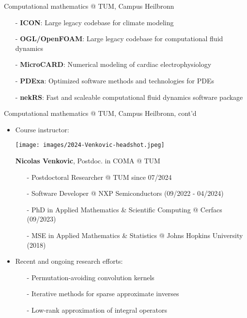 \documentclass[t,usepdftitle=false]{beamer}
\begin{document}
\begin{frame}{Computational mathematics @ TUM, Campus Heilbronn}
\begin{itemize}
\begin{itemize}
\item[-] \textbf{ICON}: Large legacy codebase for climate modeling\vspace{.05cm}
\item[-] \textbf{OGL/OpenFOAM}: Large legacy codebase for computational fluid dynamics\vspace{.05cm}
\item[-] \textbf{MicroCARD}: Numerical modeling of cardiac electrophysiology\vspace{.05cm}
\item[-] \textbf{PDExa}: Optimized software methods and technologies for PDEs\vspace{.05cm}
\item[-] \textbf{nekRS}: Fast and scaleable computational fluid dynamics software package
\end{itemize}
\end{itemize}
\end{frame}

\begin{frame}{Computational mathematics @ TUM, Campus Heilbronn, cont'd}
\begin{itemize}
\item Course instructor:
\begin{center}\texttt{[image: images/2024-Venkovic-headshot.jpeg]}\end{center}\vspace{.15cm}
\textbf{Nicolas Venkovic}, Postdoc. in COMA @ TUM%
\begin{itemize}
\item[-] Postdoctoral Researcher @ TUM since 07/2024\vspace{.07cm}
\item[-] Software Developer @ NXP Semiconductors (09/2022 - 04/2024)\vspace{.07cm}
\item[-] PhD in Applied Mathematics \& Scientific Computing @ Cerfacs (09/2023)\vspace{.07cm}
\item[-] MSE in Applied Mathematics \& Statistics @ Johns Hopkins University (2018)\vspace{.07cm}
\end{itemize}
\item Recent and ongoing research efforts:
\begin{itemize}
\item[-] Permutation-avoiding convolution kernels\vspace{.07cm}
\item[-] Iterative methods for sparse approximate inverses\vspace{.07cm}
\item[-] Low-rank approximation of integral operators
\end{itemize}
\end{itemize}
\end{frame}
\end{document}
